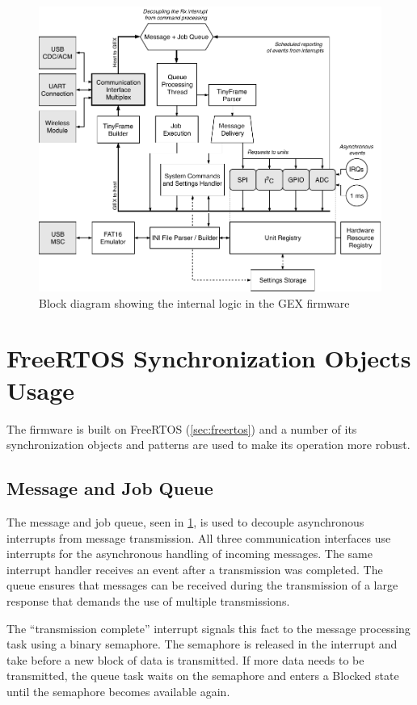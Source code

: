 \begin{figure}[h]
	\centering
	\includegraphics[width=\textwidth] {img/gex-internal.pdf}
	\caption{\label{fig:gex-internal}Block diagram showing the internal logic in the GEX firmware}
\end{figure}

\section{FreeRTOS Synchronization Objects Usage} \label{sec:rtos-in-gex}

The firmware is built on FreeRTOS (\cref{sec:freertos}) and a number of its synchronization objects and patterns are used to make its operation more robust.

\subsection{Message and Job Queue}

The message and job queue, seen in \cref{fig:gex-internal}, is used to decouple asynchronous interrupts from message transmission. All three communication interfaces use interrupts for the asynchronous handling of incoming messages. The same interrupt handler receives an event after a transmission was completed. The queue ensures that messages can be received during the transmission of a large response that demands the use of multiple transmissions.

The ``transmission complete'' interrupt signals this fact to the message processing task using a binary semaphore. The semaphore is released in the interrupt and take before a new block of data is transmitted. If more data needs to be transmitted, the queue task waits on the semaphore and enters a Blocked state until the semaphore becomes available again.

